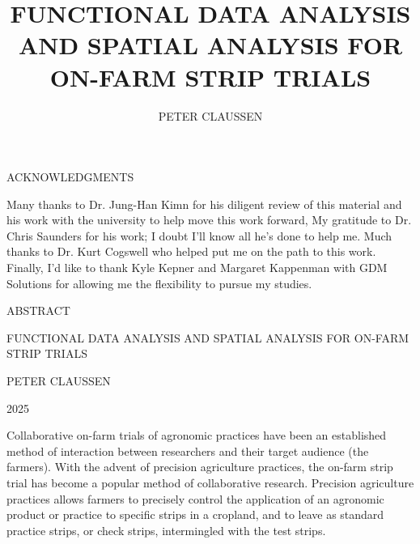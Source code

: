 \documentclass[phdcss]{SDSUThesis}
\title{FUNCTIONAL DATA ANALYSIS AND SPATIAL ANALYSIS FOR ON-FARM STRIP TRIALS}
\author{PETER CLAUSSEN}
\begin{document}
\frontmatter

\maketitle

\acceptancepage

\begin{center}
   ACKNOWLEDGMENTS
\end{center}

   Many thanks to Dr. Jung-Han Kimn for his diligent review of this material and his work with the university to help move this work forward, My gratitude to Dr. Chris Saunders for his work; I doubt I'll know all he's done to help me. Much thanks to Dr. Kurt Cogswell who helped put me on the path to this work. Finally, I'd like to thank Kyle Kepner and Margaret Kappenman with GDM Solutions for allowing me the flexibility to pursue my studies.
   


\pagebreak


\clearpage
{}
{}
\tableofcontents



 
\clearpage


 
 \begin{center}
ABSTRACT
\end{center}

\begin{center}
FUNCTIONAL DATA ANALYSIS AND SPATIAL ANALYSIS FOR ON-FARM STRIP TRIALS
\end{center}

\begin{center}
PETER CLAUSSEN
\end{center}

\begin{center}
2025
\end{center}

Collaborative on-farm trials of agronomic practices have been an established method of interaction between researchers and their target audience (the farmers). With the advent of precision agriculture practices, the on-farm strip trial has become a popular method of collaborative research. Precision agriculture practices allows farmers to precisely control the application of an agronomic product or practice to specific strips in a cropland, and to leave as standard practice strips, or check strips, intermingled with the test strips.
\end{document}

